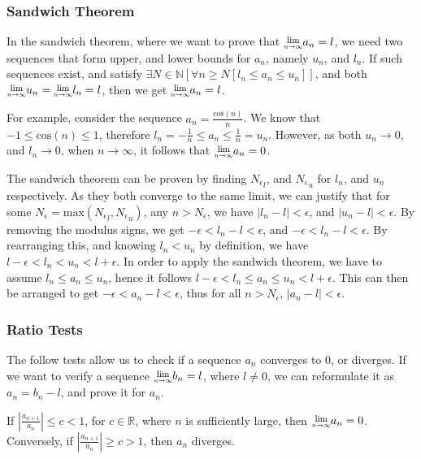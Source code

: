 \documentclass[a4paper, 12pt]{article}
\newcommand{\limit}[2]{\raisebox{0.5ex}{\scalebox{0.8}{$\displaystyle{\lim_{#1 \to #2}}$}}}
\begin{document}
            \subsubsection*{Sandwich Theorem}
                In the sandwich theorem, where we want to prove that $\limit{n}{\infty}a_n = l$, we need two sequences that form upper, and lower bounds for $a_n$, namely $u_n$, and $l_n$. If such sequences exist, and satisfy $\exists N \in \mathbb{N}[\forall n \geq N [l_n \leq a_n \leq u_n]]$, and both $\limit{n}{\infty}u_n = \limit{n}{\infty}l_n = l$, then we get $\limit{n}{\infty}a_n = l$.
                \medskip

                For example, consider the sequence $a_n = \frac{\text{cos}(n)}{n}$. We know that $-1 \leq \text{cos}(n) \leq 1$, therefore $l_n = -\frac{1}{n} \leq a_n \leq \frac{1}{n} = u_n$. However, as both $u_n \to 0$, and $l_n \to 0$, when $n \to \infty$, it follows that $\limit{n}{\infty}a_n = 0$.
                \medskip

                The sandwich theorem can be proven by finding ${N_\epsilon}_l$, and ${N_\epsilon}_u$ for $l_n$, and $u_n$ respectively. As they both converge to the same limit, we can justify that for some $N_\epsilon = \text{max}({N_\epsilon}_l, {N_\epsilon}_u)$, any $n > N_\epsilon$, we have $|l_n - l| < \epsilon$, and $|u_n - l| < \epsilon$. By removing the modulus signs, we get $-\epsilon < l_n - l < \epsilon$, and $-\epsilon < l_n - l < \epsilon$. By rearranging this, and knowing $l_n < u_n$ by definition, we have $l - \epsilon < l_n < u_n < l + \epsilon$. In order to apply the sandwich theorem, we have to assume $l_n \leq a_n \leq u_n$, hence it follows $l - \epsilon < l_n \leq a_n \leq u_n < l + \epsilon$. This can then be arranged to get $-\epsilon < a_n - l < \epsilon$, thus for all $n > N_\epsilon$, $|a_n - l| < \epsilon$.
            \subsubsection*{Ratio Tests}
                The follow tests allow us to check if a sequence $a_n$ converges to 0, or diverges. If we want to verify a sequence $\limit{n}{\infty}b_n = l$, where $l \neq 0$, we can reformulate it as $a_n = b_n - l$, and prove it for $a_n$.
                \medskip

                If $|\frac{a_{n+1}}{a_n}| \leq c < 1$, for $c \in \mathbb{R}$, where $n$ is sufficiently large, then $\limit{n}{\infty}a_n = 0$. Conversely, if $|\frac{a_{n+1}}{a_n}| \geq c > 1$, then $a_n$ diverges.
                \medskip
\end{document}
